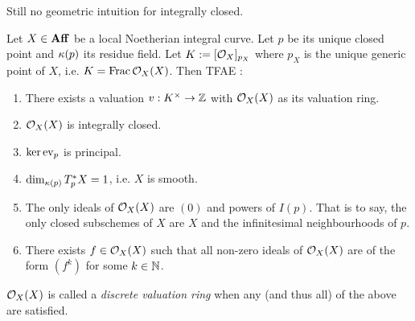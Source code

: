 \documentclass[./main.tex]{subfiles}
\begin{document}
\begin{rmk}
  Still no geometric intuition for integrally closed. 
\end{rmk}

\begin{prop}

  Let $X \in \mathbf{Aff}$ be a local Noetherian integral curve. 
  Let $p$ be its unique closed point and $\kappa(p)$ its residue field. 
  Let $K := [\mathcal{O}_X]_{p_X}$ where $p_X$ is the unique generic point of $X$,
  i.e. $K = \mathrm{Frac}\, \mathcal{O}_X(X)$.
  Then TFAE : 
  \begin{enumerate}
    \item There exists a valuation $v : K^\times \to \mathbb{Z}$ with 
    $\mathcal{O}_X(X)$ as its valuation ring. 
    \item $\mathcal{O}_X(X)$ is integrally closed. 
    \item $\ker\operatorname{ev}_{p}$ is principal. 
    \item $\dim_{\kappa(p)} T_{p}^* X = 1$,
    i.e. $X$ is smooth. 
    \item The only ideals of $\mathcal{O}_X(X)$ are $(0)$ and powers of $I(p)$.
    That is to say,
    the only closed subschemes of $X$ are $X$ and 
    the infinitesimal neighbourhoods of $p$.
    \item There exists $f \in \mathcal{O}_X(X)$ such that 
    all non-zero ideals of $\mathcal{O}_X(X)$ are of the form 
    $(f^k)$ for some $k \in \mathbb{N}$.
  \end{enumerate}
  $\mathcal{O}_X(X)$ is called a \emph{discrete valuation ring} when 
  any (and thus all) of the above are satisfied. 

\end{prop}
\end{document}
